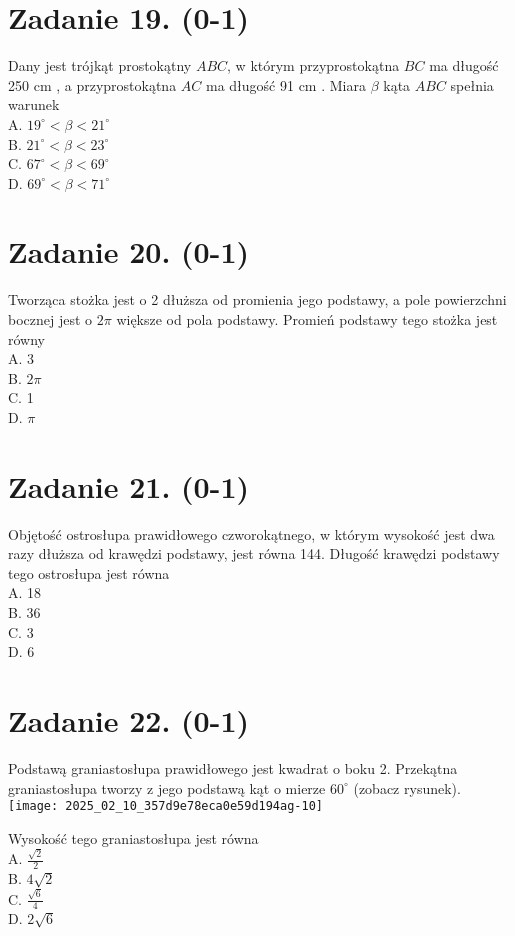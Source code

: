 \documentclass[10pt]{article}
\begin{document}
\section*{Zadanie 19. (0-1)}
Dany jest trójkąt prostokątny \(A B C\), w którym przyprostokątna \(B C\) ma długość 250 cm , a przyprostokątna \(A C\) ma długość 91 cm . Miara \(\beta\) kąta \(A B C\) spełnia warunek\\
A. \(19^{\circ}<\beta<21^{\circ}\)\\
B. \(21^{\circ}<\beta<23^{\circ}\)\\
C. \(67^{\circ}<\beta<69^{\circ}\)\\
D. \(69^{\circ}<\beta<71^{\circ}\)

\section*{Zadanie 20. (0-1)}
Tworząca stożka jest o 2 dłuższa od promienia jego podstawy, a pole powierzchni bocznej jest o \(2 \pi\) większe od pola podstawy. Promień podstawy tego stożka jest równy\\
A. 3\\
B. \(2 \pi\)\\
C. 1\\
D. \(\pi\)

\section*{Zadanie 21. (0-1)}
Objętość ostrosłupa prawidłowego czworokątnego, w którym wysokość jest dwa razy dłuższa od krawędzi podstawy, jest równa 144. Długość krawędzi podstawy tego ostrosłupa jest równa\\
A. 18\\
B. 36\\
C. 3\\
D. 6

\section*{Zadanie 22. (0-1)}
Podstawą graniastosłupa prawidłowego jest kwadrat o boku 2. Przekątna graniastosłupa tworzy z jego podstawą kąt o mierze \(60^{\circ}\) (zobacz rysunek).\\
\texttt{[image: 2025\_02\_10\_357d9e78eca0e59d194ag-10]}

Wysokość tego graniastosłupa jest równa\\
A. \(\frac{\sqrt{2}}{2}\)\\
B. \(4 \sqrt{2}\)\\
C. \(\frac{\sqrt{6}}{4}\)\\
D. \(2 \sqrt{6}\)
\end{document}
